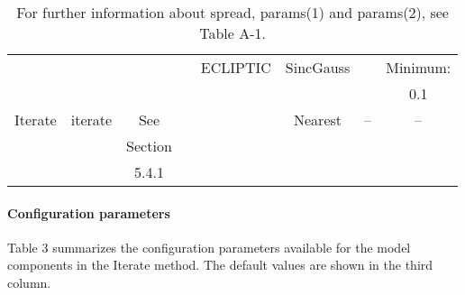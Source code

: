 \documentclass[twoside,11pt]{article}
\renewcommand{\_}{\texttt{\symbol{95}}}
\begin{document}
\begin{table}
\begin{tabular}{lccccccc}
       &           &           &              &   ECLIPTIC       &  SincGauss &              &   Minimum:\\
       &           &           &              &                  &            &              &           0.1\\
\hline
Iterate& iterate   &    See    &              &                  &  Nearest   &     --       &   -- \\
       &           &    Section&              &                  &            &              & \\
       &           &    5.4.1  &              &                  &            &              & \\
\hline
\end{tabular}
\caption{For further information about spread, params(1) and params(2), see Table A-1.}
\end{table}

\paragraph{Configuration parameters}

Table 3 summarizes the configuration parameters available for the
model components in the Iterate method. The default values are shown
in the third column.
\end{document}
